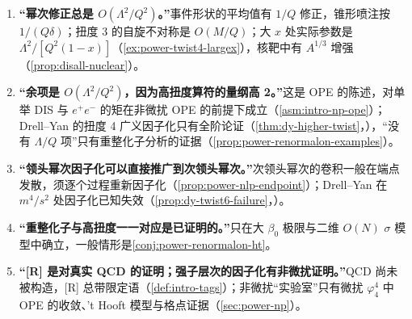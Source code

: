 \begin{tcolorbox}[enhanced,breakable,title=常见误解（本章）,fonttitle=\bfseries,
  colback=yellow!3!white,colframe=orange!60!black,boxrule=0.6pt,arc=2pt,
  left=5pt,right=5pt,top=3pt,bottom=3pt,before skip=6pt,after skip=6pt]
\begin{enumerate}[label=(\arabic*),leftmargin=1.6em,itemsep=0pt,topsep=1pt]
\item %
\textbf{“幂次修正总是 $O(\Lambda^2/Q^2)$。”}事件形状的平均值有 $1/Q$ 修正\cite{DokshitzerWebber1995}，锥形喷注按 $1/(Q\delta)$\cite{Korchemsky:1994is}；扭度 3 的自旋不对称是 $O(M/Q)$；大 $x$ 处实际参数是 $\Lambda^2/[Q^2(1-x)]$（\cref{ex:power-twist4-largex}），核靶中有 $A^{1/3}$ 增强（\cref{prop:disall-nuclear}）。
\item %
\textbf{“余项是 $O(\Lambda^2/Q^2)$，因为高扭度算符的量纲高 2。”}这是 OPE 的陈述，对单举 DIS 与 $e^+e^-$ 的矩在非微扰 OPE 的前提下成立（\cref{asm:intro-np-ope}）；Drell--Yan 的扭度 4 广义因子化只有全阶论证（\cref{thm:dy-higher-twist}，\tagA），“没有 $\Lambda/Q$ 项”只有重整化子分析的证据（\cref{prop:power-renormalon-examples}）。
\item %
\textbf{“领头幂次因子化可以直接推广到次领头幂次。”}次领头幂次的卷积一般在端点发散，须逐个过程重新因子化（\cref{prop:power-nlp-endpoint}）；Drell--Yan 在 $m^4/s^2$ 处因子化已知失效（\cref{prop:dy-twist6-failure}，\tagV）。
\item %
\textbf{“重整化子与高扭度一一对应是已证明的。”}只在大 $\beta_0$ 极限与二维 $O(N)$ $\sigma$ 模型中确立，一般情形是\cref{conj:power-renormalon-ht}。
\item %
\textbf{“[R] 是对真实 QCD 的证明；强子层次的因子化有非微扰证明。”}QCD 尚未被构造，[R] 总带限定语（\cref{def:intro-tags}）；非微扰“实验室”只有微扰 $\varphi^4_4$ 中 OPE 的收敛、't Hooft 模型与格点证据（\cref{sec:power-np}）。
\end{enumerate}
\end{tcolorbox}

